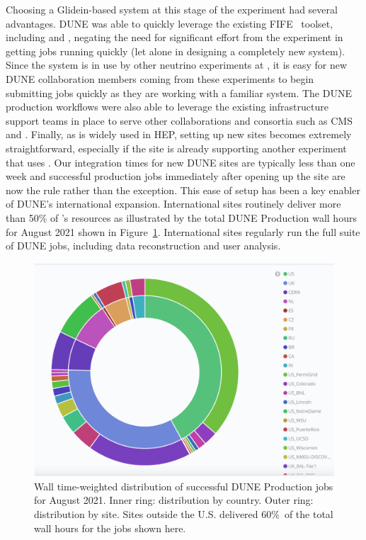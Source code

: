 \documentclass[../main-v1.tex]{subfiles}
\begin{document}
Choosing a Glidein-based system at this stage of the experiment had several advantages. DUNE was able to quickly leverage the existing FIFE~\cite{herner2019advances} toolset, including  and , negating the
need for significant effort from the experiment in getting jobs running quickly (let alone in designing a completely new system). Since the system is in use by other neutrino experiments at , it is easy for new DUNE collaboration members coming from these experiments to 
begin submitting jobs quickly as they are working with a familiar system. The DUNE production workflows were also able to leverage the existing infrastructure support teams in place to serve other collaborations and consortia such as 
CMS and . Finally, as  is widely used in HEP, setting up new sites becomes extremely straightforward, especially if the site is already supporting another experiment that uses . Our integration times for new 
DUNE sites are typically less than one week and successful production jobs immediately after opening up the site are now the rule rather than the exception. This ease of setup has been a key enabler of DUNE's international expansion. International sites routinely deliver more than 50\% of 's  resources as illustrated by  the total DUNE Production wall hours for August 2021  shown in Figure~\ref{fig-country}. International sites regularly run the full suite of DUNE jobs, including  data reconstruction and user analysis. %

\begin{figure}[htb]
\centering
\includegraphics[width=.8\textwidth]{graphics/Workflow/August2021.png}
\caption{Wall time-weighted distribution of successful DUNE Production jobs for August 2021. Inner ring: distribution by country. Outer ring: distribution by site. Sites outside the U.S. delivered 60\%\ of the total wall hours for the jobs shown here.}
\label{fig-country}       %
\end{figure}
\end{document}
